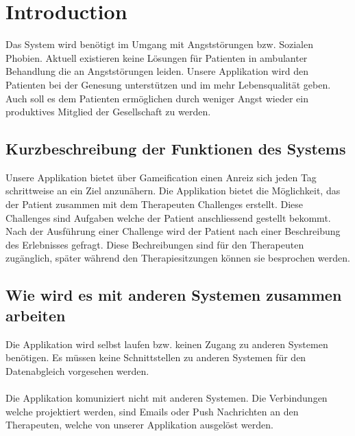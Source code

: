 \chapter{Introduction}

Das System wird benötigt im Umgang mit Angststörungen bzw. Sozialen \gls{Phobien}. Aktuell existieren keine Lösungen für Patienten in ambulanter Behandlung die an Angststörungen leiden. Unsere Applikation wird den Patienten bei der Genesung unterstützen und im mehr Lebensqualität geben. Auch soll es dem Patienten ermöglichen durch weniger Angst wieder ein produktives Mitglied der Gesellschaft zu werden.

\section{Kurzbeschreibung der Funktionen des Systems}

Unsere Applikation bietet über \gls{Gameification} einen Anreiz sich jeden Tag schrittweise an ein Ziel anzunähern. Die Applikation bietet die Möglichkeit, das der Patient zusammen mit dem Therapeuten \gls{Challenges} erstellt. Diese \gls{Challenges} sind Aufgaben welche der Patient anschliessend gestellt bekommt. Nach der Ausführung einer Challenge wird der Patient nach einer Beschreibung des Erlebnisses gefragt. Diese Bechreibungen sind für den Therapeuten zugänglich, später während den Therapiesitzungen können sie besprochen werden.

\section{Wie wird es mit anderen Systemen zusammen arbeiten}

Die Applikation wird selbst laufen bzw. keinen Zugang zu anderen Systemen benötigen. Es müssen keine Schnittstellen zu anderen Systemen für den Datenabgleich vorgesehen werden. \\ \\
Die Applikation komuniziert nicht mit anderen Systemen. Die Verbindungen welche projektiert werden, sind Emails oder Push Nachrichten an den Therapeuten, welche von unserer Applikation ausgelöst werden.
